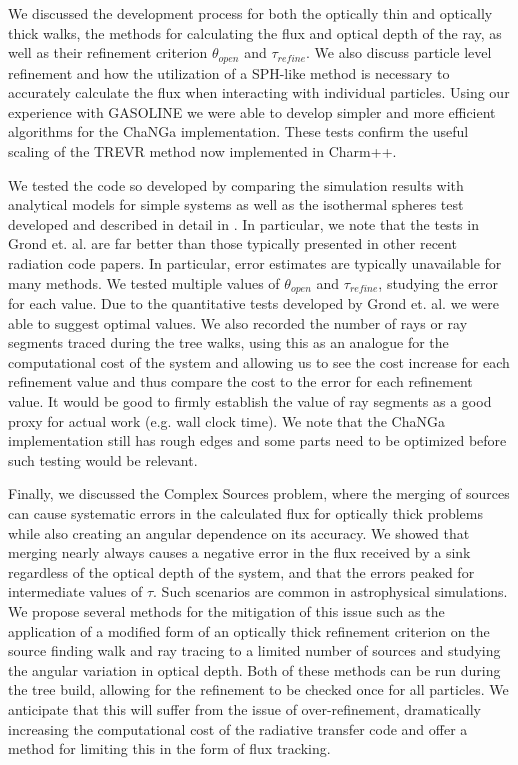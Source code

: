 We discussed the development process for both the optically thin and optically thick walks, the methods for calculating the flux and optical depth of the ray, as well as their refinement criterion $\theta_{open}$ and $\tau_{refine}$. We also discuss particle level refinement and how the utilization of a SPH-like method is necessary to accurately calculate the flux when interacting with individual particles. Using our experience with GASOLINE we were able to develop simpler and more efficient algorithms for the ChaNGa implementation. These tests confirm the useful scaling of the TREVR method now implemented in Charm++.

We tested the code so developed by comparing the simulation results with analytical models for simple systems as well as the isothermal spheres test developed and described in detail in \citet{grond}. In particular, we note that the tests in  Grond et. al. are far better than those typically presented in other recent radiation code papers. In particular, error estimates are typically unavailable for many methods. We tested multiple values of $\theta_{open}$ and $\tau_{refine}$, studying the error for each value. Due to the quantitative tests developed by Grond et. al. we were able to suggest optimal values. We also recorded the number of rays or ray segments traced during the tree walks, using this as an analogue for the computational cost of the system and allowing us to see the cost increase for each refinement value and thus compare the cost to the error for each refinement value. It would be good to firmly establish the value of ray segments as a good proxy for actual work (e.g. wall clock time). We note that the ChaNGa implementation still has rough edges and some parts need to be optimized before such testing would be relevant.

Finally, we discussed the Complex Sources problem, where the merging of sources can cause systematic errors in the calculated flux for optically thick problems while also creating an angular dependence on its accuracy. We showed that merging nearly always causes a negative error in the flux received by a sink regardless of the optical depth of the system, and that the errors peaked for intermediate values of $\tau$. Such scenarios are common in astrophysical simulations. We propose several methods for the mitigation of this issue such as the application of a modified form of an optically thick refinement criterion on the source finding walk and ray tracing to a limited number of sources and studying the angular variation in optical depth. Both of these methods can be run during the tree build, allowing for the refinement to be checked once for all particles. We anticipate that this will suffer from the issue of over-refinement, dramatically increasing the computational cost of the radiative transfer code and offer a method for limiting this in the form of flux tracking. 

